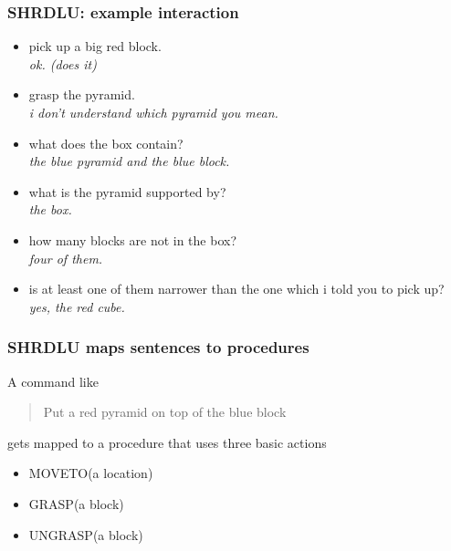 \documentclass[ignorenonframetext]{beamer}
\begin{document}
\begin{frame}\frametitle{SHRDLU: example interaction}
\begin{itemize}
\item pick up a big red block. 
\\ {\sl ok. (does it) }
\item grasp the pyramid. 
\\ {\sl i don't understand which pyramid you mean. }
\item what does the box contain? 
\\ {\sl the blue pyramid and the blue block. }
\item what is the pyramid supported by? 
\\ {\sl the box. }
\item how many blocks are not in the box? 
\\ {\sl four of them. }
\item is at least one of them narrower than the one which i told you to pick up? 
\\ {\sl yes, the red cube. }
\end{itemize}
\end{frame}

\begin{frame}\frametitle{SHRDLU maps sentences to procedures}
A command like
\begin{quote}
Put a red pyramid on top of the blue block
\end{quote}
gets mapped to a procedure that uses three basic actions
\begin{itemize}
\item MOVETO(a location)
\item GRASP(a block)
\item UNGRASP(a block)
\end{itemize}
\end{frame}
\end{document}
